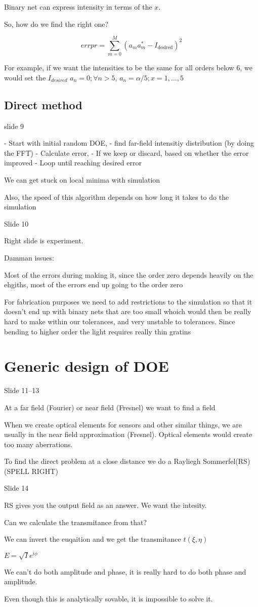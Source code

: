 \documentclass[../main/main.tex]{subfiles}
\begin{document}
Binary net  can express intensity in terms of the $x$.


So, how do we find the right one?

\begin{equation}
	errpr = \sum_{m=0}^M (a_m a_m^* - I_{\textrm{desired}})^2
\end{equation}

For example, if we want the intensities to be the same for all orders below 6, we would set the $I_{desired}$ $a_n = 0; \forall n > 5$, $a_n = \alpha/5; x=1,\ldots,5$

\subsection{Direct method}

slide 9

- Start with initial random DOE,
- find far-field intensitiy distribution (by doing the FFT)
- Calculate error,
- If we keep or discard, based on whether the error improved
- Loop until reaching desired error

We can get stuck on local minima with simulation

Also, the speed of this algorithm depends on how long it takes to do the simulation

Slide 10


Right slide is experiment.

Damman issues:

Most of the errors during making it, since the order zero depends heavily on the ehgiths, most of the errors end up going to the order zero

For fabrication purposes we need to add restrictions to the simulation so that it doesn't end up with binary nets that are too small whoich would then be really hard to make within our tolerances, and very unstable to tolerances. Since bending to higher order the light requires really thin gratins


\section{Generic design of DOE}
Slide 11--13

At a far field (Fourier) or near field (Fresnel) we want to find a field

When we create optical elements for sensors and other similar things, we are usually in the near field approximation (Fresnel). Optical elements would create too many aberrations.


To find the direct problem at a close distance we do a Rayliegh Sommerfel(RS) (SPELL RIGHT)

Slide 14

RS  gives you the output field as an answer. We want the intesity.

Can we calculate the transmitance from that?

We can invert the euqaition and we get the transmitance $t(\xi, \eta)$

$E = \sqrt{I} e^{i \phi}$

We can't do both amplitude and phase, it is really hard to do both phase and amplitude.

Even though this is analytically sovable, it is impossible to solve it.
\end{document}
